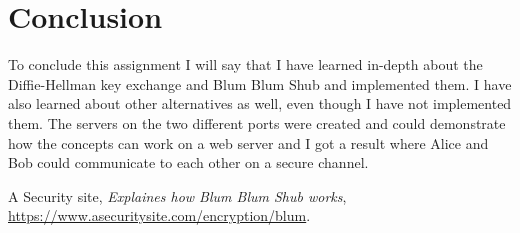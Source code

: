 \documentclass[12pt, letterpaper]{article}
\begin{document}
\section*{Conclusion}
To conclude this assignment I will say that I have learned in-depth about the Diffie-Hellman key exchange and Blum Blum Shub and implemented them. I have also learned about other alternatives as well, even though I have not implemented them. The servers on the two different ports were created and could demonstrate how the concepts can work on a web server and I got a result where Alice and Bob could communicate to each other on a secure channel.

\begin{thebibliography}{10} 
 A Security site,  \emph{Explaines how Blum Blum Shub works},
\url{https://www.asecuritysite.com/encryption/blum}.
\end{thebibliography}
\end{document}
